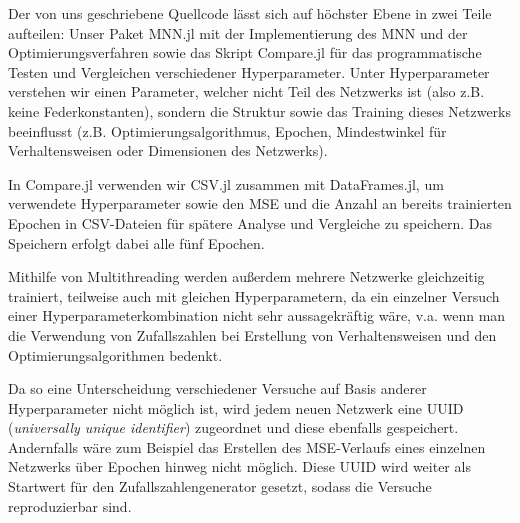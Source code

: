 \documentclass[10pt]{scrartcl}
\newcommand*{\eng}[1]{\textit{#1}}
\begin{document}


Der von uns geschriebene Quellcode lässt sich auf höchster Ebene in zwei Teile aufteilen: Unser Paket MNN.jl mit der Implementierung des MNN und der Optimierungsverfahren sowie das Skript Compare.jl für das programmatische Testen und Vergleichen verschiedener Hyperparameter.
Unter Hyperparameter verstehen wir einen Parameter, welcher nicht Teil des Netzwerks ist (also z.B. keine Federkonstanten), sondern die Struktur sowie das Training dieses Netzwerks beeinflusst (z.B. Optimierungsalgorithmus, Epochen, Mindestwinkel für Verhaltensweisen oder Dimensionen des Netzwerks). 

In Compare.jl verwenden wir CSV.jl zusammen mit DataFrames.jl, um verwendete Hyperparameter sowie den MSE und die Anzahl an bereits trainierten Epochen in CSV-Dateien für spätere Analyse und Vergleiche zu speichern. 
Das Speichern erfolgt dabei alle fünf Epochen.

Mithilfe von Multithreading werden außerdem mehrere Netzwerke gleichzeitig trainiert, teilweise auch mit gleichen Hyperparametern, da ein einzelner Versuch einer Hyperparameterkombination nicht sehr aussagekräftig wäre, v.a. wenn man die Verwendung von Zufallszahlen bei Erstellung von Verhaltensweisen und den Optimierungsalgorithmen bedenkt.

Da so eine Unterscheidung verschiedener Versuche auf Basis anderer Hyperparameter nicht möglich ist, wird jedem neuen Netzwerk eine UUID (\eng{universally unique identifier})
zugeordnet und diese ebenfalls gespeichert.
Andernfalls wäre zum Beispiel das Erstellen des MSE-Verlaufs eines einzelnen Netzwerks über Epochen hinweg nicht möglich.
Diese UUID wird weiter als Startwert für den Zufallszahlengenerator gesetzt, sodass die Versuche reproduzierbar sind.
\end{document}
